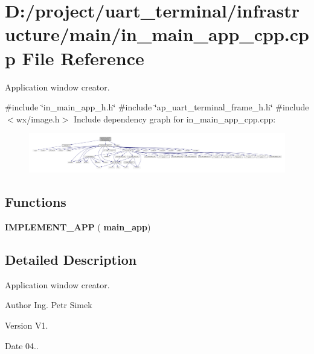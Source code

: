 \section{D\+:/project/uart\+\_\+terminal/infrastructure/main/in\+\_\+main\+\_\+app\+\_\+cpp.cpp File Reference}
\label{in__main__app__cpp_8cpp}


Application window creator.  


{\ttfamily \#include \char`\"{}in\+\_\+main\+\_\+app\+\_\+h.\+h\char`\"{}}\newline
{\ttfamily \#include \char`\"{}ap\+\_\+uart\+\_\+terminal\+\_\+frame\+\_\+h.\+h\char`\"{}}\newline
{\ttfamily \#include $<$wx/image.\+h$>$}\newline
Include dependency graph for in\+\_\+main\+\_\+app\+\_\+cpp.\+cpp\+:\nopagebreak
\begin{figure}[H]
\begin{center}
\leavevmode
\includegraphics[width=350pt]{in__main__app__cpp_8cpp__incl}
\end{center}
\end{figure}
\subsection*{Functions}
\begin{DoxyCompactItemize}
\item 
\textbf{ I\+M\+P\+L\+E\+M\+E\+N\+T\+\_\+\+A\+PP} (\textbf{ main\+\_\+app})
\end{DoxyCompactItemize}


\subsection{Detailed Description}
Application window creator. 

\begin{DoxyAuthor}{Author}
Ing. Petr Simek 
\end{DoxyAuthor}
\begin{DoxyVersion}{Version}
V1. 
\end{DoxyVersion}
\begin{DoxyDate}{Date}
04.. 
\end{DoxyDate}
